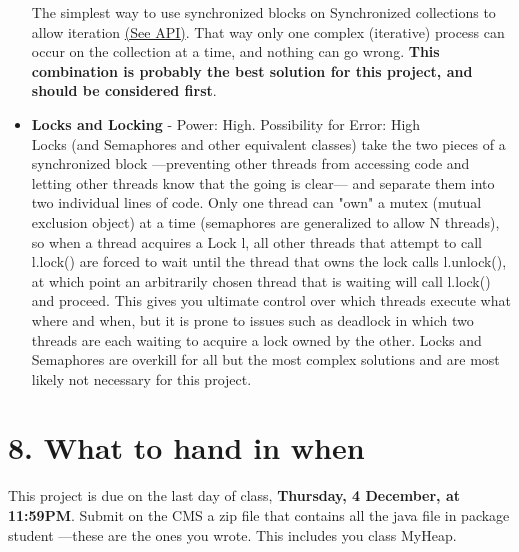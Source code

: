 \documentclass[11pt]{article}
\begin{document}
\begin{itemize}
The simplest way to use synchronized blocks on Synchronized collections to allow iteration \href{http://docs.oracle.com/javase/7/docs/api/java/util/Collections.html\#synchronizedCollection(java.util.Collection)}{({\color{blue}\underline{See API}})}. That way only one complex (iterative) process can occur on the collection at a time, and nothing can go wrong. \textbf{This combination is probably the best solution for this project, and should be considered first}.
\item \textbf{Locks and Locking} - Power: High. Possibility for Error: High\\
Locks (and Semaphores and other equivalent classes) take the two pieces of a synchronized block ---preventing other threads from accessing code and letting other threads know that the going is clear--- and separate them into two individual lines of code. Only one thread can "own" a mutex (mutual exclusion object) at a time (semaphores are generalized to allow N threads), so when a thread acquires a Lock l, all other threads that attempt to call l.lock() are forced to wait until the thread that owns the lock calls l.unlock(), at which point an arbitrarily chosen thread that is waiting will call l.lock() and proceed. This gives you ultimate control over which threads execute what where and when, but it is  prone to issues such as deadlock in which two threads are each waiting to acquire a lock owned by the other. Locks and Semaphores are overkill for all but the most complex solutions and are most likely not necessary for this project. 
\end{itemize}

\section{8. What to hand in when}
This project is due on the last day of class, \textbf{Thursday, 4 December, at 11:59PM}.
Submit on the CMS a zip file that contains all the java file in package student ---these are the ones you wrote.
This includes you class MyHeap.
\\
\end{document}
